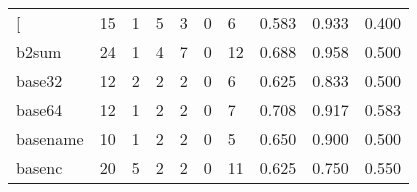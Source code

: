 \begin{longtable}{lp{1.3cm}p{1.3cm}p{1.3cm}p{1.3cm}p{1.3cm}p{1.3cm}p{1.3cm}p{1.3cm}p{1.3cm}}
\bottomrule
\endlastfoot
{[}         &                     15 &                                             1 &                                            5 &                                           3 &                                            0 &                                          6 &                                0.583 &                                  0.933 &                                0.400 \\
b2sum     &                     24 &                                             1 &                                            4 &                                           7 &                                            0 &                                         12 &                                0.688 &                                  0.958 &                                0.500 \\
base32    &                     12 &                                             2 &                                            2 &                                           2 &                                            0 &                                          6 &                                0.625 &                                  0.833 &                                0.500 \\
base64    &                     12 &                                             1 &                                            2 &                                           2 &                                            0 &                                          7 &                                0.708 &                                  0.917 &                                0.583 \\
basename  &                     10 &                                             1 &                                            2 &                                           2 &                                            0 &                                          5 &                                0.650 &                                  0.900 &                                0.500 \\
basenc    &                     20 &                                             5 &                                            2 &                                           2 &                                            0 &                                         11 &                                0.625 &                                  0.750 &                                0.550 \\

\end{longtable}
